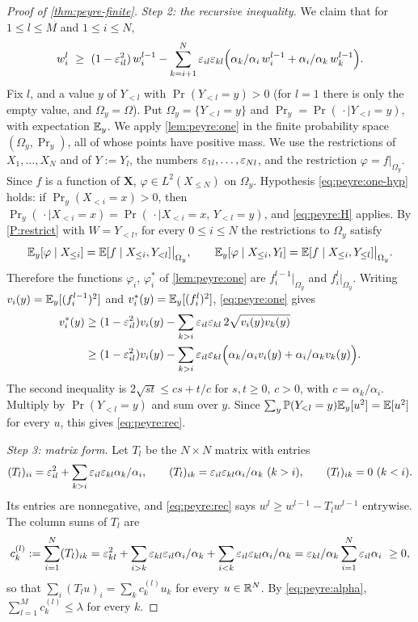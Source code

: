 \begin{proof}[Proof of \cref{thm:peyre-finite}]
\emph{Step 2: the recursive inequality.} We claim that for $1\le l\le M$ and
$1\le i\le N$,
\begin{equation}\label{eq:peyre:rec}
  w_i^l\ \ge\ (1-\varepsilon_{il}^2)\,w_i^{l-1}
  -\sum_{k=i+1}^N\varepsilon_{il}\varepsilon_{kl}\Big(\alpha_k/\alpha_i\,w_i^{l-1}
  +\alpha_i/\alpha_k\,w_k^{l-1}\Big).
\end{equation}
Fix $l$, and a value $y$ of $Y_{<l}$ with $\Pr(Y_{<l}=y)>0$ (for $l=1$ there
is only the empty value, and $\Omega_y=\Omega$). Put $\Omega_y=\{Y_{<l}=y\}$
and $\Pr_y=\Pr(\,\cdot\mid Y_{<l}=y)$, with expectation $\mathbb E_y$. We apply
\cref{lem:peyre:one} in the finite probability space $(\Omega_y,\Pr_y)$, all
of whose points have positive mass. We use the restrictions of
$X_1,\dots,X_N$ and of $Y:=Y_l$, the numbers $\varepsilon_{1l},\dots,\varepsilon_{Nl}$, and
the restriction $\varphi=f|_{\Omega_y}$. Since $f$ is a function of
$\mathbf X$, $\varphi\in L^2(X_{\le N})$ on $\Omega_y$. Hypothesis
\eqref{eq:peyre:one-hyp} holds: if $\Pr_y(X_{<i}=x)>0$, then
$\Pr_y(\,\cdot\mid X_{<i}=x)=\Pr(\,\cdot\mid X_{<i}=x,\,Y_{<l}=y)$, and
\eqref{eq:peyre:H} applies. By \ref{P:restrict} with $W=Y_{<l}$, for every
$0\le i\le N$ the restrictions to $\Omega_y$ satisfy
\[
  \mathbb E_y[\varphi\mid X_{\le i}]=\mathbb E[f\mid X_{\le i},Y_{<l}]\big|_{\Omega_y},\qquad
  \mathbb E_y[\varphi\mid X_{\le i},Y_l]=\mathbb E[f\mid X_{\le i},Y_{\le l}]\big|_{\Omega_y}.
\]
Therefore the functions $\varphi_i$, $\varphi_i^*$ of \cref{lem:peyre:one}
are $f_i^{l-1}|_{\Omega_y}$ and $f_i^l|_{\Omega_y}$. Writing
$v_i(y)=\mathbb E_y[(f_i^{l-1})^2]$ and $v_i^*(y)=\mathbb E_y[(f_i^l)^2]$,
\eqref{eq:peyre:one} gives
\begin{align*}
  v_i^*(y)&\ge(1-\varepsilon_{il}^2)v_i(y)
  -\sum_{k>i}\varepsilon_{il}\varepsilon_{kl}\,2\sqrt{v_i(y)v_k(y)}\\
  &\ge(1-\varepsilon_{il}^2)v_i(y)-\sum_{k>i}\varepsilon_{il}\varepsilon_{kl}
  \Big(\alpha_k/\alpha_iv_i(y)+\alpha_i/\alpha_kv_k(y)\Big).
\end{align*}
The second inequality is $2\sqrt{st}\le cs+t/c$ for $s,t\ge0$, $c>0$, with
$c=\alpha_k/\alpha_i$. Multiply by $\Pr(Y_{<l}=y)$ and sum over $y$. Since
$\sum_y\mathbb P(Y_{<l}=y)\mathbb E_y[u^2]=\mathbb E[u^2]$ for every $u$, this gives
\eqref{eq:peyre:rec}.

\emph{Step 3: matrix form.} Let $T_l$ be the $N\times N$ matrix with entries
\[
  (T_l)_{ii}=\eps_{il}^2+\sum_{k>i}\eps_{il}\eps_{kl}\frac{\alpha_k}{\alpha_i},
  \qquad
  (T_l)_{ik}=\eps_{il}\eps_{kl}\frac{\alpha_i}{\alpha_k}\ (k>i),\qquad
  (T_l)_{ik}=0\ (k<i).
\]
Its entries are nonnegative, and \eqref{eq:peyre:rec} says
$w^l\ge w^{l-1}-T_lw^{l-1}$ entrywise. The column sums of $T_l$ are
\[
  c_k^{(l)}:=\sum_{i=1}^N(T_l)_{ik}
  =\eps_{kl}^2+\sum_{i>k}\eps_{kl}\eps_{il}\frac{\alpha_i}{\alpha_k}
  +\sum_{i<k}\eps_{il}\eps_{kl}\frac{\alpha_i}{\alpha_k}
  =\frac{\eps_{kl}}{\alpha_k}\sum_{i=1}^N\eps_{il}\alpha_i\ \ge0,
\]
so that $\sum_{i}(T_lu)_i=\sum_kc_k^{(l)}u_k$ for every $u\in\mathbb R^N$. By
\eqref{eq:peyre:alpha}, $\sum_{l=1}^Mc_k^{(l)}\le\lambda$ for every $k$.


\end{proof}
